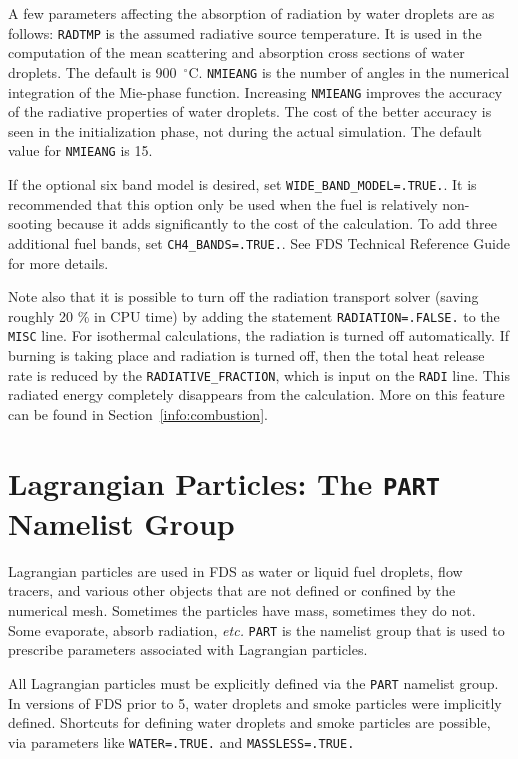\documentclass[11pt]{book}
\newcommand{\ct}{\tt\small}
\begin{document}
A few parameters affecting the absorption of radiation by water
droplets are as follows: {\ct RADTMP} is the assumed radiative source temperature.
It is used in the computation of the mean scattering
and absorption cross sections of water droplets. The default is 900~$^\circ$C.
{\ct NMIEANG} is the number of angles in the numerical integration of the Mie-phase function.
Increasing {\ct NMIEANG} improves the accuracy
of the radiative properties of water droplets. The cost
of the better accuracy is seen in the initialization phase,
not during the actual simulation. The default value for {\ct NMIEANG}
is 15.

If the optional six band model is desired,
set {\ct WIDE\_BAND\_MODEL=.TRUE.}. It is recommended that this option
only be used when the fuel is relatively non-sooting because it
adds significantly to the cost of the calculation. To add three
additional fuel bands, set {\ct CH4\_BANDS=.TRUE.}. See FDS Technical
Reference Guide for more details.

Note also that it is possible to turn off the radiation transport
solver (saving roughly 20 \% in CPU time) by adding the statement
{\ct RADIATION=.FALSE.} to the {\ct MISC} line. For isothermal
calculations, the radiation is turned off automatically. If burning
is taking place and radiation is turned off, then the total heat
release rate is reduced by the {\ct RADIATIVE\_FRACTION}, which is
input on the {\ct RADI} line. This radiated energy completely
disappears from the calculation. More on this feature can be found in
Section~\ref{info:combustion}.






\clearpage

\chapter{Lagrangian Particles: The \texorpdfstring{{\tt PART}}{PART} Namelist Group}
\label{info:PART}

Lagrangian particles are used in FDS as water or liquid fuel
droplets, flow tracers, and various other objects that are not defined or confined by the numerical mesh. Sometimes the
particles have mass, sometimes they do not. Some evaporate,
absorb radiation, {\em etc.}
{\ct PART} is the namelist group that is used to prescribe
parameters associated with Lagrangian particles.

\begin{warning}
All Lagrangian particles must be explicitly defined via the {\ct PART} namelist group. In versions of FDS prior to 5, water droplets and
smoke particles were implicitly defined. Shortcuts for defining water droplets and smoke particles are possible, via parameters like
{\ct WATER=.TRUE.} and {\ct MASSLESS=.TRUE.}
\end{warning}
\end{document}
